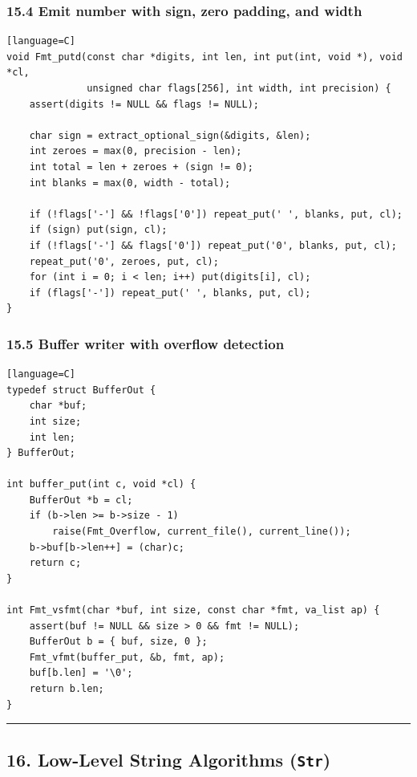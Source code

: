 \documentclass[11pt]{article}
\begin{document}
\subsubsection{15.4 Emit number with sign, zero padding, and width}\label{emit-number-with-sign-zero-padding-and-width}

\begin{verbatim}[language=C]
void Fmt_putd(const char *digits, int len, int put(int, void *), void *cl,
              unsigned char flags[256], int width, int precision) {
    assert(digits != NULL && flags != NULL);

    char sign = extract_optional_sign(&digits, &len);
    int zeroes = max(0, precision - len);
    int total = len + zeroes + (sign != 0);
    int blanks = max(0, width - total);

    if (!flags['-'] && !flags['0']) repeat_put(' ', blanks, put, cl);
    if (sign) put(sign, cl);
    if (!flags['-'] && flags['0']) repeat_put('0', blanks, put, cl);
    repeat_put('0', zeroes, put, cl);
    for (int i = 0; i < len; i++) put(digits[i], cl);
    if (flags['-']) repeat_put(' ', blanks, put, cl);
}
\end{verbatim}

\subsubsection{15.5 Buffer writer with overflow detection}\label{buffer-writer-with-overflow-detection}

\begin{verbatim}[language=C]
typedef struct BufferOut {
    char *buf;
    int size;
    int len;
} BufferOut;

int buffer_put(int c, void *cl) {
    BufferOut *b = cl;
    if (b->len >= b->size - 1)
        raise(Fmt_Overflow, current_file(), current_line());
    b->buf[b->len++] = (char)c;
    return c;
}

int Fmt_vsfmt(char *buf, int size, const char *fmt, va_list ap) {
    assert(buf != NULL && size > 0 && fmt != NULL);
    BufferOut b = { buf, size, 0 };
    Fmt_vfmt(buffer_put, &b, fmt, ap);
    buf[b.len] = '\0';
    return b.len;
}
\end{verbatim}

\begin{center}\rule{0.5\linewidth}{0.5pt}\end{center}

\subsection{\texorpdfstring{16. Low-Level String Algorithms (\texttt{Str})}{16. Low-Level String Algorithms (Str)}}\label{low-level-string-algorithms-str}
\end{document}
